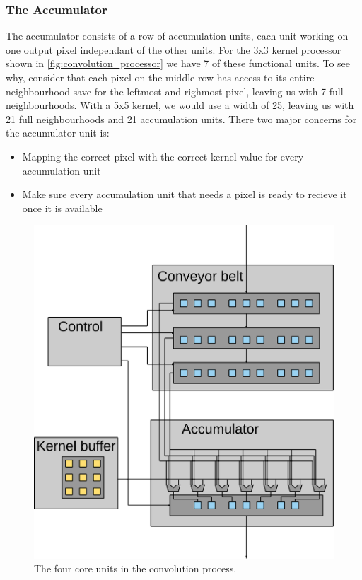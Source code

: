 \subsubsection{The Accumulator}
The accumulator consists of a row of accumulation units, each unit working on one output pixel independant of the other units.
For the 3x3 kernel processor shown in \ref{fig:convolution_processor} we have 7 of these functional units.
To see why, consider that each pixel on the middle row has access to its entire neighbourhood save for the leftmost and righmost pixel, leaving us with 7 full neighbourhoods.
With a 5x5 kernel, we would use a width of 25, leaving us with 21 full neighbourhoods and 21 accumulation units.
There two major concerns for the accumulator unit is:
\begin{itemize}
    \item Mapping the correct pixel with the correct kernel value for every accumulation unit
    \item Make sure every accumulation unit that needs a pixel is ready to recieve it once it is available
\end{itemize}


\begin{figure}[h!]
    \includegraphics[width=\linewidth]{img/processor_overview.png}
    \caption{The four core units in the convolution process.}
    \label{fig:processor_core}
\end{figure}

